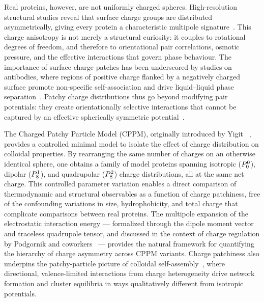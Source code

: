 \documentclass{article}
\begin{document}
Real proteins, however, are not uniformly charged spheres.
High-resolution structural studies reveal that surface charge groups are distributed asymmetrically, giving every protein a characteristic multipole signature~\cite{bozic2017a}.
This charge anisotropy is not merely a structural curiosity: it couples to rotational degrees of freedom, and therefore to orientational pair correlations, osmotic pressure, and the effective interactions that govern phase behaviour.
The importance of surface charge patches has been underscored by studies on antibodies, where regions of positive charge flanked by a negatively charged surface promote non-specific self-association and drive liquid--liquid phase separation~\cite{ausserwoger2023}.
Patchy charge distributions thus go beyond modifying pair potentials: they create orientationally selective interactions that cannot be captured by an effective spherically symmetric potential~\cite{yigit2015a,yigit2017a}.

The Charged Patchy Particle Model (CPPM), originally introduced by Yigit \etal~\cite{yigit2015a}, provides a controlled minimal model to isolate the effect of charge distribution on colloidal properties.
By rearranging the same number of charges on an otherwise identical sphere, one obtains a family of model proteins spanning isotropic ($P^{0}_{0}$), dipolar ($P^{1}_{8}$), and quadrupolar ($P^{2}_{8}$) charge distributions, all at the same net charge.
This controlled parameter variation enables a direct comparison of thermodynamic and structural observables as a function of charge patchiness, free of the confounding variations in size, hydrophobicity, and total charge that complicate comparisons between real proteins.
The multipole expansion of the electrostatic interaction energy — formalized through the dipole moment vector~\cite{bozic2017a} and traceless quadrupole tensor, and discussed in the context of charge regulation by Podgornik and coworkers~\cite{podgornik2018a} — provides the natural framework for quantifying the hierarchy of charge asymmetry across CPPM variants.
Charge patchiness also underpins the patchy-particle picture of colloidal self-assembly~\cite{bianchi2025}, where directional, valence-limited interactions from charge heterogeneity drive network formation and cluster equilibria in ways qualitatively different from isotropic potentials.
\end{document}
